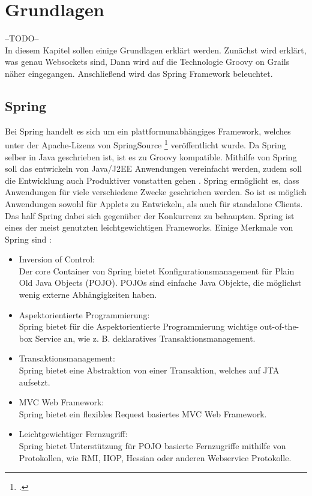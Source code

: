 
\section{Grundlagen}

--TODO--\\
In diesem Kapitel sollen einige Grundlagen erklärt werden. Zunächst wird erklärt, was genau Websockets sind, Dann wird auf die Technologie Groovy on Grails näher eingegangen. Anschließend wird das Spring Framework beleuchtet.

\subsection{Spring}

Bei Spring handelt es sich um ein plattformunabhängiges Framework, welches unter der Apache-Lizenz von  SpringSource \footcite{https://spring.io/} veröffentlicht wurde. Da Spring selber in Java geschrieben ist, ist es zu Groovy kompatible. Mithilfe von Spring soll das entwickeln von Java/J2EE Anwendungen vereinfacht werden, zudem soll die Entwicklung auch Produktiver vonstatten gehen \cite[Seite 1]{johnson2005}. 
Spring ermöglicht es, dass Anwendungen für viele verschiedene Zwecke geschrieben werden. So ist es möglich Anwendungen sowohl für Applets zu Entwickeln, als auch für standalone Clients. Das half Spring dabei sich gegenüber der Konkurrenz zu behaupten. Spring ist eines der meist genutzten leichtgewichtigen Frameworks. 
Einige Merkmale von Spring sind \cite[Seite 5]{johnson2005}:

\begin{itemize}
\item Inversion of Control:\\ Der core Container von Spring bietet Konfigurationsmanagement für Plain Old Java Objects (POJO). POJOs sind einfache Java Objekte, die möglichst wenig externe Abhängigkeiten haben. 
\\
\item Aspektorientierte Programmierung:\\ Spring bietet für die Aspektorientierte Programmierung wichtige out-of-the-box Service an, wie z. B. deklaratives Transaktionsmanagement.
\\
\item Transaktionsmanagement:\\ Spring bietet eine Abstraktion von einer Transaktion, welches auf \ac{JTA} aufsetzt.
\\
\item MVC Web Framework:\\ Spring bietet ein flexibles Request basiertes MVC Web Framework. 
\\
\item Leichtgewichtiger Fernzugriff:\\ Spring bietet Unterstützung für POJO basierte Fernzugriffe mithilfe von Protokollen, wie RMI, IIOP, Hessian oder anderen Webservice Protokolle.
\end{itemize}

